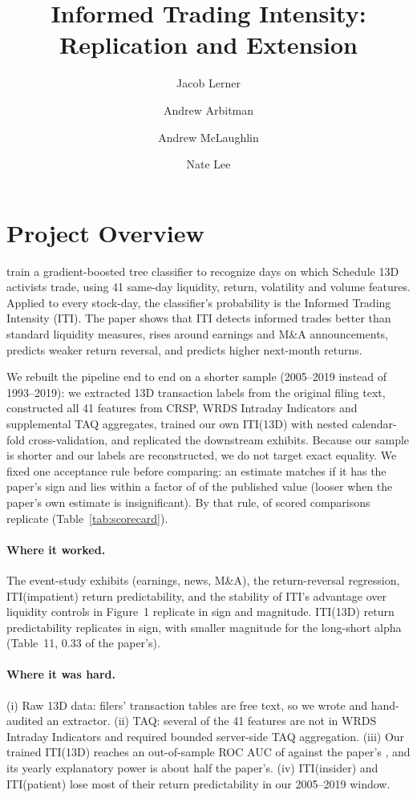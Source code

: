\documentclass{article}
\title{Informed Trading Intensity: Replication and Extension}
\author{Jacob Lerner \and Andrew Arbitman \and Andrew McLaughlin \and Nate Lee}
\date{}
\begin{document}
\maketitle

\section{Project Overview}
\cite{bogousslavsky2024informed} train a gradient-boosted tree classifier to
recognize days on which Schedule 13D activists trade, using 41 same-day
liquidity, return, volatility and volume features. Applied to every stock-day,
the classifier's probability is the Informed Trading Intensity (ITI). The paper
shows that ITI detects informed trades better than standard liquidity
measures, rises around earnings and M\&A announcements, predicts weaker return
reversal, and predicts higher next-month returns.

We rebuilt the pipeline end to end on a shorter sample (2005--2019 instead of
1993--2019): we extracted 13D transaction labels from the original filing text,
constructed all 41 features from CRSP, WRDS Intraday Indicators and supplemental
TAQ aggregates, trained our own ITI(13D) with nested calendar-fold
cross-validation, and replicated the downstream exhibits. Because our sample is
shorter and our labels are reconstructed, we do not target exact equality. We
fixed one acceptance rule before comparing: an estimate matches if it has the
paper's sign and lies within a factor of \ScoreBand{} of the published value
(looser when the paper's own estimate is insignificant). By that rule,
\ScorePassed{} of \ScoreScored{} scored comparisons replicate
(Table~\ref{tab:scorecard}).

\paragraph{Where it worked.} The event-study exhibits (earnings, news, M\&A),
the return-reversal regression, ITI(impatient) return predictability, and the
stability of ITI's advantage over liquidity controls in Figure~1 replicate in
sign and magnitude. ITI(13D) return predictability replicates in sign, with
smaller magnitude for the long-short alpha (Table~11, 0.33 of the paper's).

\paragraph{Where it was hard.} (i) Raw 13D data: filers' transaction tables are
free text, so we wrote and hand-audited an extractor. (ii) TAQ: several of the
41 features are not in WRDS Intraday Indicators and required bounded server-side
TAQ aggregation. (iii) Our trained ITI(13D) reaches an out-of-sample ROC AUC of
\ModelAUC{} against the paper's \PaperAUC{}, and its yearly explanatory power is
about half the paper's. (iv) ITI(insider) and ITI(patient) lose most of their
return predictability in our 2005--2019 window.
\end{document}
